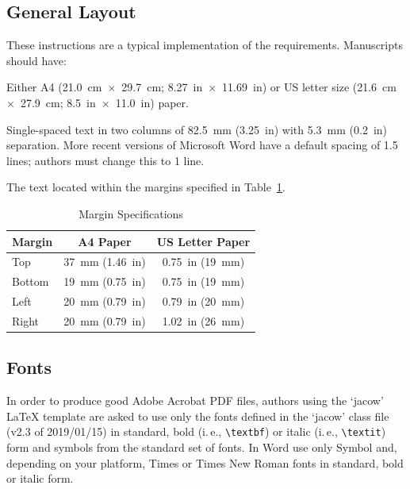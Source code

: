 \documentclass[a4paper,
               nospread,     %
               ]{jacow}
\begin{document}
\subsection{General Layout}

These instructions are a typical implementation of the
requirements. Manuscripts should have:
\begin{Itemize}
    \item  Either A4 (\SI{21.0}{cm}~$\times$~\SI{29.7}{cm}; \SI{8.27}{in}~$\times$~\SI{11.69}{in}) or US
           letter size (\SI{21.6}{cm}~$\times$~\SI{27.9}{cm}; \SI{8.5}{in}~$\times$~\SI{11.0}{in}) paper.
    \item  Single-spaced text in two columns of \SI{82.5}{mm} (\SI{3.25}{in}) with \SI{5.3}{mm}
           (\SI{0.2}{in}) separation. More recent versions of Microsoft Word have a default spacing of 1.5 lines;
           authors must change this to 1 line.
    \item  The text located within the margins specified in Table~\ref{tab:margins}.
\end{Itemize}
\begin{table}[!hbt]
   \centering
   \caption{Margin Specifications}
   \begin{tabular}{lcc}
       \toprule
       \textbf{Margin} & \textbf{A4 Paper}                      & \textbf{US Letter Paper} \\
       \midrule
           Top         & \SI{37}{mm} (\SI{1.46}{in})            & \SI{0.75}{in} (\SI{19}{mm})        \\ %
          Bottom       & \SI{19}{mm} (\SI{0.75}{in})            & \SI{0.75}{in} (\SI{19}{mm})        \\ %
           Left        & \SI{20}{mm} (\SI{0.79}{in})            & \SI{0.79}{in} (\SI{20}{mm})        \\ %
           Right       & \SI{20}{mm} (\SI{0.79}{in})            & \SI{1.02}{in} (\SI{26}{mm})        \\
       \bottomrule
   \end{tabular}
   \label{tab:margins}
\end{table}

\subsection{Fonts}

In order to produce good Adobe Acrobat PDF files, authors
using the `jacow' \LaTeX{} template are asked to use only the fonts
defined in the ‘jacow’ class file (v2.3 of 2019/01/15) in standard, 
bold (i.\,e., \verb|\textbf|) or italic (i.\,e., \verb|\textit|) form and
symbols from the standard set of fonts. In Word use only
Symbol and, depending on your platform, Times or Times New Roman
fonts in standard, bold or italic form.
\end{document}
